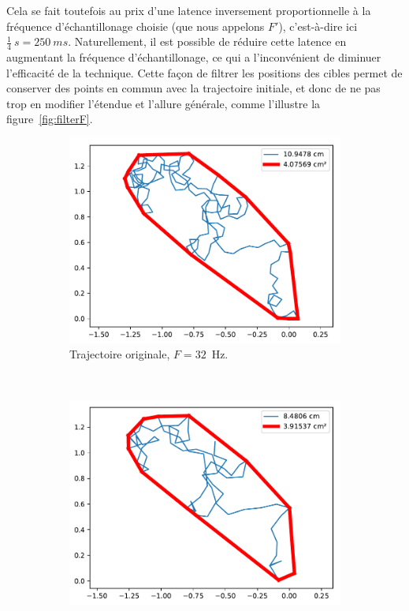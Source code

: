 	Cela se fait toutefois au prix d'une latence inversement proportionnelle à la fréquence d'échantillonage choisie (que nous appelons $F'$), c'est-à-dire ici $\frac{1}{4}~s = 250~ms$. Naturellement, il est possible de réduire cette latence en augmentant la fréquence d'échantillonage, ce qui a l'inconvénient de diminuer l'efficacité de la technique. Cette façon de filtrer les positions des cibles permet de conserver des points en commun avec la trajectoire initiale, et donc de ne pas trop en modifier l'étendue et l'allure générale, comme l'illustre la figure~\ref{fig:filterF}.
	
	\begin{figure}[!htb]
		\begin{subfigure}[t]{0.49\textwidth}
			\centering
			\includegraphics[width=\textwidth]{figures/ch5/2_19_freqFilter_2_19_120_32}
			\caption{Trajectoire originale, $F = 32$~Hz.}
			\label{fig:filterFnoFilter}
		\end{subfigure}
		~
		\begin{subfigure}[t]{0.49\textwidth}
			\centering
			\includegraphics[width=\textwidth]{figures/ch5/2_19_freqFilter_2_19_120_32_filter_16}

\end{subfigure}
\end{figure}

